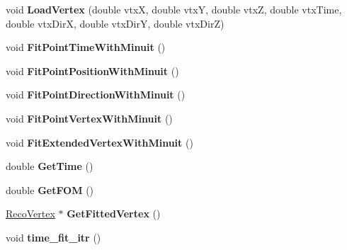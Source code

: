 \begin{DoxyCompactItemize}
\item 
\hypertarget{classMinuitOptimizer_ad3c187d2afcc6e1ee7e82962d162aae8}{
void {\bfseries LoadVertex} (double vtxX, double vtxY, double vtxZ, double vtxTime, double vtxDirX, double vtxDirY, double vtxDirZ)}
\label{classMinuitOptimizer_ad3c187d2afcc6e1ee7e82962d162aae8}

\item 
\hypertarget{classMinuitOptimizer_ae07d1d7eb8e694627fe0d3310a47ea23}{
void {\bfseries FitPointTimeWithMinuit} ()}
\label{classMinuitOptimizer_ae07d1d7eb8e694627fe0d3310a47ea23}

\item 
\hypertarget{classMinuitOptimizer_a3b3a75c840dd6f2c97d5a58da7d5db29}{
void {\bfseries FitPointPositionWithMinuit} ()}
\label{classMinuitOptimizer_a3b3a75c840dd6f2c97d5a58da7d5db29}

\item 
\hypertarget{classMinuitOptimizer_a247cd4ed76564b3639f45f5c448f34c4}{
void {\bfseries FitPointDirectionWithMinuit} ()}
\label{classMinuitOptimizer_a247cd4ed76564b3639f45f5c448f34c4}

\item 
\hypertarget{classMinuitOptimizer_a655d9ff06d5dce21e2f3506034a1c9a2}{
void {\bfseries FitPointVertexWithMinuit} ()}
\label{classMinuitOptimizer_a655d9ff06d5dce21e2f3506034a1c9a2}

\item 
\hypertarget{classMinuitOptimizer_a298f53de3f402874b73c2e742b3c16f5}{
void {\bfseries FitExtendedVertexWithMinuit} ()}
\label{classMinuitOptimizer_a298f53de3f402874b73c2e742b3c16f5}

\item 
\hypertarget{classMinuitOptimizer_a067c18d943608f5780dc7313b7978e2a}{
double {\bfseries GetTime} ()}
\label{classMinuitOptimizer_a067c18d943608f5780dc7313b7978e2a}

\item 
\hypertarget{classMinuitOptimizer_a5a764ad18fa653b67d1840d101f76c1e}{
double {\bfseries GetFOM} ()}
\label{classMinuitOptimizer_a5a764ad18fa653b67d1840d101f76c1e}

\item 
\hypertarget{classMinuitOptimizer_af3094089b0ee9093735d6ed66de01192}{
\hyperlink{classRecoVertex}{RecoVertex} $\ast$ {\bfseries GetFittedVertex} ()}
\label{classMinuitOptimizer_af3094089b0ee9093735d6ed66de01192}

\item 
\hypertarget{classMinuitOptimizer_a684c745cd0e3150ae223276c3017d150}{
void {\bfseries time\_\-fit\_\-itr} ()}
\label{classMinuitOptimizer_a684c745cd0e3150ae223276c3017d150}


\end{DoxyCompactItemize}

